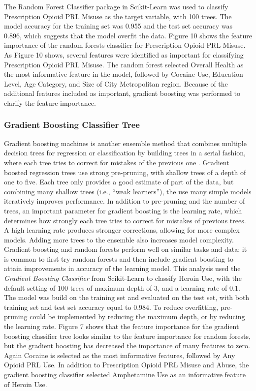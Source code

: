 \documentclass[sigconf]{acmart}
\begin{document}
The Random Forest Classifier package in Scikit-Learn was used to classify
Prescription Opioid PRL Misuse as the target variable, with 100 trees. The 
model accuracy for the training set was 0.955 and the test set accuracy was 
0.896, which suggests that the model overfit the data. Figure 10 shows the 
feature importance of the random forests classifier for Prescription Opioid 
PRL Misuse. As Figure 10 shows, several features were identified as important
for classifying Prescription Opioid PRL Misuse. The random forest selected 
Overall Health as the most informative feature in the model, followed by 
Cocaine Use, Education Level, Age Category, and Size of City Metropolitan 
region. Because of the additional features included as important, gradient 
boosting was performed to clarify the feature importance.
\subsubsection{Gradient Boosting Classifier Tree}

Gradient boosting machines is another ensemble method that combines multiple
decision trees for regression or classification by building trees in a serial 
fashion, where each tree tries to correct for mistakes of the previous one
\cite{muller17}. Gradient boosted regression trees use strong pre-pruning, 
with shallow trees of a depth of one to five. Each tree only provides a good
estimate of part of the data, but combining many shallow trees (i.e., ``weak 
learners''), the use many simple models iteratively improves performance. In 
addition to pre-pruning and the number of trees, an important parameter for 
gradient boosting is the learning rate, which determines how strongly each
tree tries to correct for mistakes of previous trees. A high learning rate
produces stronger corrections, allowing for more complex models. Adding
more trees to the ensemble also increases model complexity. Gradient boosting
and random forests perform well on similar tasks and data; it is common to
first try random forests and then include gradient boosting to attain 
improvements in accuracy of the learning model. This analysis used the 
\emph{Gradient Boosting Classifier} from Scikit-Learn to classify Heroin Use, 
with the default setting of 100 trees of maximum depth of 3, and a learning 
rate of 0.1. The model was build on the training set and evaluated on the test 
set, with both training set and test set accuracy equal to 0.984. To reduce
overfitting, pre-pruning could be implemented by reducing the maximum depth, 
or by reducing the learning rate. Figure 7 shows that the feature importance 
for the gradient boosting classifier tree looks similar to the feature 
importance for random forests, but the gradient boosting has decreased the 
importance of many features to zero. Again Cocaine is selected as the most 
imformative features, followed by Any Opioid PRL Use. In addition to 
Prescription Opioid PRL Misuse and Abuse, the gradient boosting classifier 
selected Amphetamine Use as an informative feature of Heroin Use. 
\end{document}
